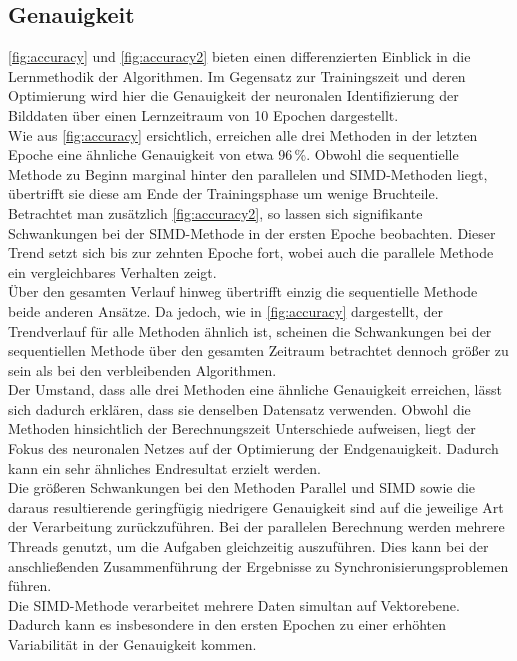 \documentclass[a4paper, 12pt]{article}
\begin{document}
\subsection{Genauigkeit}\label{chapter..5.2}

\autoref{fig:accuracy} und \autoref{fig:accuracy2} bieten einen differenzierten Einblick 
in die Lernmethodik der Algorithmen. Im Gegensatz zur Trainingszeit und deren 
Optimierung wird hier die Genauigkeit der neuronalen Identifizierung der Bilddaten über 
einen Lernzeitraum von 10 Epochen dargestellt.\\
Wie aus \autoref{fig:accuracy} ersichtlich, erreichen alle drei Methoden in der letzten 
Epoche eine ähnliche Genauigkeit von etwa 96\,\%. Obwohl die sequentielle Methode zu 
Beginn marginal hinter den parallelen und SIMD-Methoden liegt, übertrifft sie diese am 
Ende der Trainingsphase um wenige Bruchteile.\\
Betrachtet man zusätzlich \autoref{fig:accuracy2}, so lassen sich signifikante 
Schwankungen bei der SIMD-Methode in der ersten Epoche beobachten. Dieser Trend setzt 
sich bis zur zehnten Epoche fort, wobei auch die parallele Methode ein vergleichbares 
Verhalten zeigt.\\
Über den gesamten Verlauf hinweg übertrifft einzig die sequentielle Methode beide 
anderen Ansätze. Da jedoch, wie in \autoref{fig:accuracy} dargestellt, der Trendverlauf 
für alle Methoden ähnlich ist, scheinen die Schwankungen bei der sequentiellen Methode 
über den gesamten Zeitraum betrachtet dennoch größer zu sein als bei den verbleibenden 
Algorithmen.\\
Der Umstand, dass alle drei Methoden eine ähnliche Genauigkeit erreichen, lässt sich 
dadurch erklären, dass sie denselben Datensatz verwenden. Obwohl die Methoden 
hinsichtlich der Berechnungszeit Unterschiede aufweisen, liegt der Fokus des neuronalen 
Netzes auf der Optimierung der Endgenauigkeit. Dadurch kann ein sehr ähnliches 
Endresultat erzielt werden.\\
Die größeren Schwankungen bei den Methoden Parallel und SIMD sowie die daraus 
resultierende geringfügig niedrigere Genauigkeit sind auf die jeweilige Art der 
Verarbeitung zurückzuführen. Bei der parallelen Berechnung werden mehrere Threads 
genutzt, um die Aufgaben gleichzeitig auszuführen. Dies kann bei der anschließenden 
Zusammenführung der Ergebnisse zu Synchronisierungsproblemen führen.\\
Die SIMD-Methode verarbeitet mehrere Daten simultan auf Vektorebene. Dadurch kann es 
insbesondere in den ersten Epochen zu einer erhöhten Variabilität in der Genauigkeit 
kommen.
\end{document}
